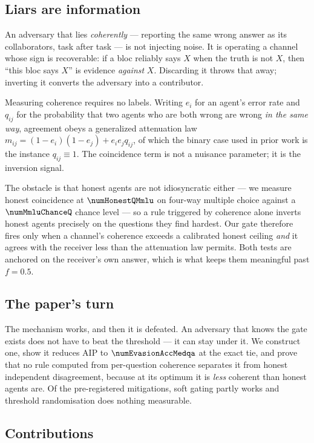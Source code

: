 \subsection{Liars are information}

An adversary that lies \emph{coherently} --- reporting the same wrong answer as
its collaborators, task after task --- is not injecting noise. It is operating a
channel whose sign is recoverable: if a bloc reliably says $X$ when the truth is
not $X$, then ``this bloc says $X$'' is evidence \emph{against} $X$. Discarding
it throws that away; inverting it converts the adversary into a contributor.

Measuring coherence requires no labels. Writing $e_i$ for an agent's error rate
and $q_{ij}$ for the probability that two agents who are both wrong are wrong
\emph{in the same way}, agreement obeys a generalized attenuation law
$m_{ij} = (1-e_i)(1-e_j) + e_i e_j q_{ij}$, of which the binary case used in
prior work is the instance $q_{ij}\equiv1$. The coincidence term is not a
nuisance parameter; it is the inversion signal.

The obstacle is that honest agents are not idiosyncratic either --- we measure
honest coincidence at $\numHonestQMmlu$ on four-way multiple choice against a
$\numMmluChanceQ$ chance level --- so a rule triggered by coherence alone inverts
honest agents precisely on the questions they find hardest. Our gate therefore
fires only when a channel's coherence exceeds a calibrated honest ceiling
\emph{and} it agrees with the receiver less than the attenuation law permits.
Both tests are anchored on the receiver's own answer, which is what keeps them
meaningful past $f=0.5$.

\subsection{The paper's turn}

The mechanism works, and then it is defeated. An adversary that knows the gate
exists does not have to beat the threshold --- it can stay under it. We construct
one, show it reduces AIP to $\numEvasionAccMedqa$ at the exact tie, and prove
that no rule computed from per-question coherence separates it from honest
independent disagreement, because at its optimum it is \emph{less} coherent than
honest agents are. Of the pre-registered mitigations, soft gating partly works
and threshold randomisation does nothing measurable.

\subsection{Contributions}

